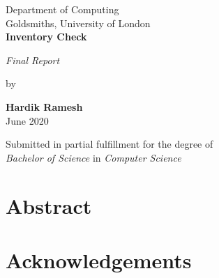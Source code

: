 \documentclass[12pt]{report}
\begin{document}
\begin{titlepage}
    \begin{center}
        \vspace*{1cm}
         \LARGE Department of Computing\\
         \LARGE Goldsmiths, University of London\\
        \vspace*{3.25cm}
        \textbf {\LARGE  Inventory Check\\}
    
        
        \vspace*{0.55cm}           
        \textit{Final Report}\\
        \vspace*{0.15cm}           

        \vspace*{2cm}
        by\\
        \vspace*{0.25cm}   

        \textbf{Hardik Ramesh\\}
        \vspace*{0.5cm}
        June 2020 
        
        \vspace*{2cm} 
        Submitted in partial fulfillment for the degree of\\
        \textit{Bachelor of Science} in \textit{Computer Science}

        \vspace{1.5cm}
        \setcounter{page}{0}
    \end{center}
\end{titlepage}

\newpage
\chapter*{Abstract}



\newpage
\chapter*{Acknowledgements}


\end{document}

